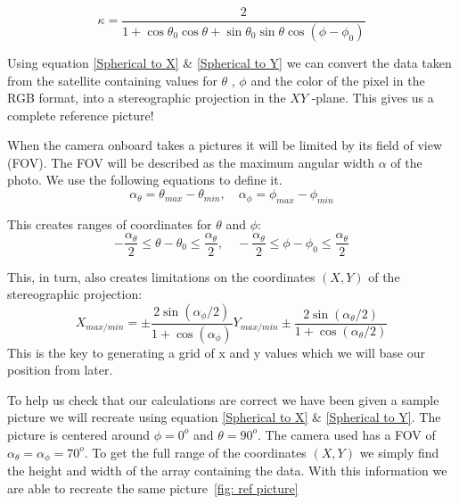 \documentclass[reprint,english,notitlepage]{revtex4-2}
\begin{document}
\begin{equation}
  \kappa = \frac{2}{1 + \cos \theta _{0}\cos \theta + \sin \theta _{0} \sin \theta \cos (\phi - \phi _{0})}
\end{equation}


Using equation \ref{Spherical to X} \& \ref{Spherical to Y} we can convert the data taken from the satellite containing values for $ \theta $ , $ \phi  $ and the color of the pixel in the RGB format, into a stereographic projection in the $ XY $ -plane. This gives us a complete reference picture!

When the camera onboard takes a pictures it will be limited by its field of view (FOV). The FOV will be described as the maximum angular width $ \alpha $ of the photo. We use the following equations to define it. 
\begin{equation} \label{eq: max angular width}
	α _{\theta} = θ _{max} - \theta _{min}, \quad α _{\phi} = ϕ _{max} - ϕ _{min}
\end{equation}

This creates ranges of coordinates for $\theta$ and $\phi$:
\begin{equation}\label{eq: limitations phi and theta}
  - \frac{\alpha _{\theta}}{2} \le θ - θ _{0} \le \frac{\alpha _{\theta }}{2}, \quad - \frac{\alpha _{\theta}}{2} \le ϕ  - ϕ _{0} \le \frac{\alpha _{\theta }}{2}
\end{equation}

This, in turn, also creates limitations on the coordinates $ (X,Y) $ of the stereographic projection: 
\begin{subequations} \label{eq: limitations X and Y lim}
	\begin{equation}
		X _{max / min} = ± \frac{2 \sin (α _{\phi} / 2)}{1 + \cos (\alpha _{\phi})}
	  \end{equation}
	  
	  
	\begin{equation}
		Y _{max / min} ± \frac{2 \sin (\alpha _{\theta}  / 2)}{1 + \cos (α _{\theta}/2)}
	\end{equation}
	
\end{subequations}
This is the key to generating a grid of x and y values which we will base our position from later. 

To help us check that our calculations are correct we have been given a sample picture we will recreate using equation \ref{Spherical to X} \& \ref{Spherical to Y}. The picture is centered around $ \phi = 0^{o} $ and $ \theta = 90^{o} $. The camera used has a FOV of $ α_{\theta} = α_{\phi} = 70^{o} $. To get the full range of the coordinates $ (X,Y) $ we simply find the height and width of the array containing the data. With this information we are able to recreate the same picture~\ref{fig: ref picture}
\end{document}
